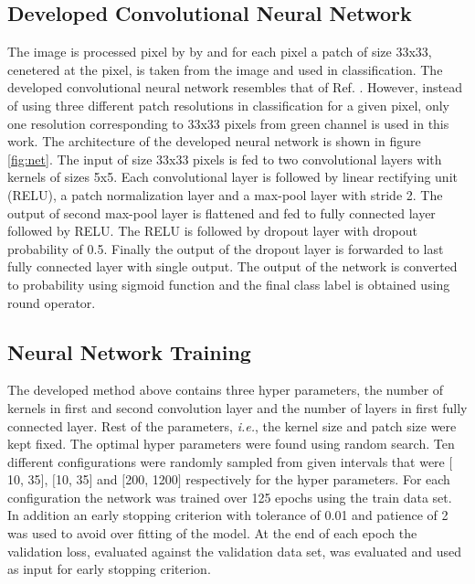 \documentclass[aps,prb,10pt,twocolumn,groupedaddress]{revtex4-1}
\begin{document}
\subsection{Developed Convolutional Neural Network}
\label{sec:computational_methods_developed_network}
The image is processed pixel by by and for each pixel a patch of size 33x33, cenetered at the pixel, is taken from the image and used in classification.
The developed convolutional neural network resembles that of Ref. \cite{tan}. However, instead of using three different patch resolutions in classification for a given pixel, only one resolution corresponding to 33x33 pixels from green channel is used in this work. The architecture of the developed neural network is shown in figure \ref{fig:net}. 
The input of size 33x33 pixels is fed to two convolutional layers with kernels of sizes 5x5. Each convolutional layer is followed by linear rectifying unit (RELU), a patch normalization layer and a max-pool layer with stride 2. The output of second max-pool layer is flattened and fed to fully connected layer followed by RELU. The RELU is followed by dropout layer with dropout probability of 0.5. Finally the output of the dropout layer is forwarded to last fully connected layer with single output. The output of the network is converted to probability using sigmoid function and the final class label is obtained using round operator.

\subsection{Neural Network Training}
\label{sec:computational_methods_training_neural_network}
The developed method above contains three hyper parameters, the number of kernels in first and second convolution layer and the number of layers in first fully connected layer. Rest of the parameters, \textit{i.e.}, the kernel size and patch size were kept fixed. The optimal hyper parameters were found using random search. Ten different configurations were randomly sampled from given intervals that were $\lbrack$10, 35$\rbrack$, $\lbrack$10, 35$\rbrack$ and $\lbrack$200, 1200$\rbrack$ respectively for the hyper parameters. For each configuration the network was trained over 125 epochs using the train data set. In addition an early stopping criterion with tolerance of 0.01 and patience of 2 was used to avoid over fitting of the model. At the end of each epoch the validation loss, evaluated against the validation data set, was evaluated and used as input for early stopping criterion.
\end{document}
